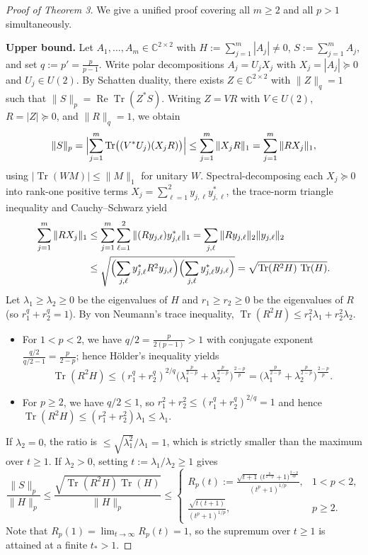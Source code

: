 \documentclass[10pt,letterpaper]{article}
\newcommand{\C}{\mathbb{C}}
\newcommand{\Tr}{\operatorname{Tr}}
\begin{document}
\begin{proof}[Proof of Theorem 3]
We give a unified proof covering all $m \ge 2$ and all $p > 1$ simultaneously.

\textbf{Upper bound.} Let $A_1,\dots,A_m \in \C^{2\times 2}$ with $H := \sum_{j=1}^m |A_j| \neq 0$, $S := \sum_{j=1}^m A_j$, and set $q := p' = \frac{p}{p-1}$. Write polar decompositions $A_j = U_j X_j$ with $X_j = |A_j| \succeq 0$ and $U_j \in U(2)$. By Schatten duality, there exists $Z \in \C^{2\times 2}$ with $\|Z\|_q = 1$ such that $\|S\|_p = \operatorname{Re}\Tr(Z^* S)$. Writing $Z = V R$ with $V \in U(2)$, $R = |Z| \succeq 0$, and $\|R\|_q = 1$, we obtain
\[
  \|S\|_p = \Bigl|\sum_{j=1}^m \Tr\bigl((V^* U_j)(X_j R)\bigr)\Bigr|
  \le \sum_{j=1}^m \|X_j R\|_1 = \sum_{j=1}^m \|R X_j\|_1,
\]
using $|\Tr(WM)| \le \|M\|_1$ for unitary $W$. Spectral-decomposing each $X_j \succeq 0$ into rank-one positive terms $X_j = \sum_{\ell=1}^2 y_{j,\ell} y_{j,\ell}^*$, the trace-norm triangle inequality and Cauchy--Schwarz yield
\begin{align*}
  \sum_{j=1}^m \|R X_j\|_1
  &\le \sum_{j=1}^m \sum_{\ell=1}^2 \|(R y_{j,\ell}) y_{j,\ell}^*\|_1
  = \sum_{j,\ell} \|R y_{j,\ell}\|_2 \|y_{j,\ell}\|_2 \\
  &\le \sqrt{\Bigl(\sum_{j,\ell} y_{j,\ell}^* R^2 y_{j,\ell}\Bigr)\Bigl(\sum_{j,\ell} y_{j,\ell}^* y_{j,\ell}\Bigr)}
  = \sqrt{\Tr(R^2 H)\,\Tr(H)}.
\end{align*}
Let $\lambda_1 \ge \lambda_2 \ge 0$ be the eigenvalues of $H$ and $r_1 \ge r_2 \ge 0$ be the eigenvalues of $R$ (so $r_1^q + r_2^q = 1$). By von Neumann's trace inequality, $\Tr(R^2 H) \le r_1^2 \lambda_1 + r_2^2 \lambda_2$.
\begin{itemize}[leftmargin=1.4em,itemsep=2pt]
  \item For $1 < p < 2$, we have $q/2 = \frac{p}{2(p-1)} > 1$ with conjugate exponent $\frac{q/2}{q/2 - 1} = \frac{p}{2-p}$; hence H\"older's inequality yields
  \[
    \Tr(R^2 H) \le (r_1^q + r_2^q)^{2/q}\bigl(\lambda_1^{\frac{p}{2-p}} + \lambda_2^{\frac{p}{2-p}}\bigr)^{\frac{2-p}{p}} = \bigl(\lambda_1^{\frac{p}{2-p}} + \lambda_2^{\frac{p}{2-p}}\bigr)^{\frac{2-p}{p}}.
  \]
  \item For $p \ge 2$, we have $q/2 \le 1$, so $r_1^2 + r_2^2 \le (r_1^q + r_2^q)^{2/q} = 1$ and hence $\Tr(R^2 H) \le (r_1^2 + r_2^2)\lambda_1 \le \lambda_1$.
\end{itemize}
If $\lambda_2 = 0$, the ratio is $\le \sqrt{\lambda_1^2}/\lambda_1 = 1$, which is strictly smaller than the maximum over $t \ge 1$. If $\lambda_2 > 0$, setting $t := \lambda_1 / \lambda_2 \ge 1$ gives
\[
  \frac{\|S\|_p}{\|H\|_p} \le \frac{\sqrt{\Tr(R^2 H)\Tr(H)}}{\|H\|_p} \le
  \begin{cases}
    \displaystyle R_p(t) := \frac{\sqrt{t+1}\,\bigl(t^{\frac{p}{2-p}} + 1\bigr)^{\frac{2-p}{2p}}}{(t^p + 1)^{1/p}}, & 1 < p < 2,\\[10pt]
    \displaystyle \frac{\sqrt{t(t+1)}}{(t^p + 1)^{1/p}}, & p \ge 2.
  \end{cases}
\]
Note that $R_p(1) = \lim_{t\to\infty} R_p(t) = 1$, so the supremum over $t \ge 1$ is attained at a finite $t_* > 1$.


\end{proof}
\end{document}
